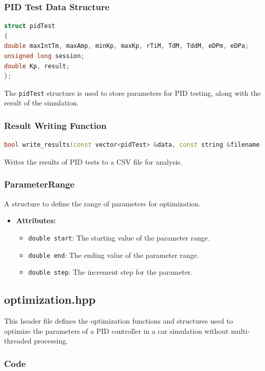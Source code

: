 \documentclass[a4paper,12pt]{article}
\begin{document}
\subsubsection{PID Test Data Structure}
\begin{lstlisting}[language=C++]
struct pidTest
{
double maxIntTm, maxAmp, minKp, maxKp, rTiM, TdM, TddM, eDPm, eDPa;
unsigned long session;
double Kp, result;
};
\end{lstlisting}
The \texttt{pidTest} structure is used to store parameters for PID testing, along with the result of the simulation.
\subsubsection{Result Writing Function}
\begin{lstlisting}[language=C++]
bool write_results(const vector<pidTest> &data, const string &filename)
\end{lstlisting}
Writes the results of PID tests to a CSV file for analysis.
\subsubsection{ParameterRange}
A structure to define the range of parameters for optimization.
\begin{itemize}
\item \textbf{Attributes:}
\begin{itemize}
\item \texttt{double start}: The starting value of the parameter range.
\item \texttt{double end}: The ending value of the parameter range.
\item \texttt{double step}: The increment step for the parameter.
\end{itemize}
\end{itemize}
\subsection{optimization.hpp}
This header file defines the optimization functions and structures used to optimize the parameters of a PID controller in a car simulation without multi-threaded processing.
\subsubsection{Code}

\end{document}

